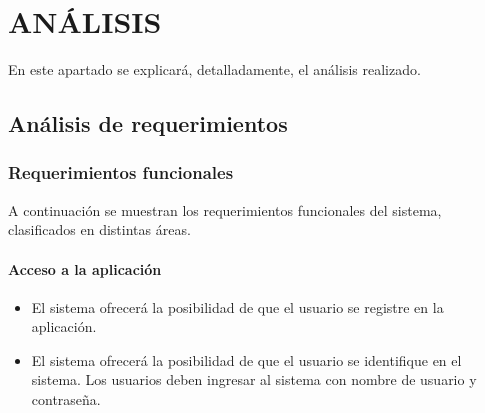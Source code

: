 \chapter[Análisis]{
  \label{chp:analisis}
  ANÁLISIS
}
\thispagestyle{numberingStyle}
\pagestyle{numberingStyle}

En este apartado se explicará, detalladamente, el análisis realizado.

\section{Análisis de requerimientos}

\subsection{Requerimientos funcionales}
A continuación se muestran los requerimientos funcionales del sistema, clasificados en distintas áreas.

\subsubsection*{Acceso a la aplicación}
\begin{itemize}
\setlength\itemsep{1pt}
\item El sistema ofrecerá la posibilidad de que el usuario se registre en la aplicación.
\item El sistema ofrecerá la posibilidad de que el usuario se identifique en el sistema. Los usuarios deben ingresar al sistema con  nombre de usuario y contraseña.
\end{itemize}

